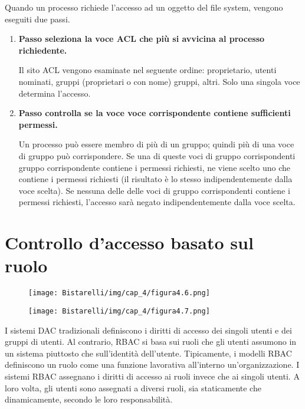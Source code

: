 Quando un processo richiede l'accesso ad un oggetto del file system, vengono eseguiti due passi.

\begin{enumerate}
    \item \textbf{Passo seleziona la voce ACL che più si avvicina al processo richiedente.}
    
Il sito ACL vengono esaminate nel seguente ordine: proprietario, utenti nominati, gruppi (proprietari o con nome) gruppi, altri. Solo una singola voce determina l'accesso.

    \item \textbf{Passo controlla se la voce voce corrispondente contiene sufficienti permessi.}

Un processo può essere membro di più di un gruppo; quindi più di una voce di gruppo può corrispondere. Se una di queste voci di gruppo corrispondenti gruppo corrispondente contiene i permessi richiesti, ne viene scelto uno che contiene i permessi richiesti (il risultato è lo stesso indipendentemente dalla voce scelta). Se nessuna delle delle voci di gruppo corrispondenti contiene i permessi richiesti, l'accesso sarà negato indipendentemente dalla voce scelta.
\end{enumerate}

\newpage
\section{Controllo d'accesso basato sul ruolo}

\begin{figure}[H]
	\centering
    \texttt{[image: Bistarelli/img/cap\_4/figura4.6.png]}
\end{figure}

\begin{figure}[H]
	\centering
    \texttt{[image: Bistarelli/img/cap\_4/figura4.7.png]}
\end{figure}


I sistemi DAC tradizionali definiscono i diritti di accesso dei singoli utenti e dei gruppi di utenti. Al contrario, RBAC si basa sui ruoli che gli utenti assumono in un sistema piuttosto che sull'identità dell'utente. Tipicamente, i modelli RBAC definiscono un ruolo come una funzione lavorativa all'interno un'organizzazione. I sistemi RBAC assegnano i diritti di accesso ai ruoli invece che ai singoli utenti. A loro volta, gli utenti sono assegnati a diversi ruoli, sia staticamente che dinamicamente, secondo le loro responsabilità.

